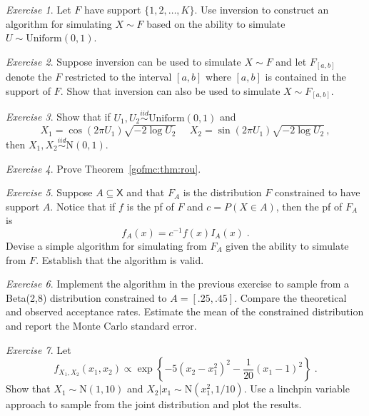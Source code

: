 \documentclass[12pt]{article}
\theoremstyle{plain}
\theoremstyle{definition}
\theoremstyle{remark}
\newtheorem{hw}{Exercise}[section]
\newcommand{\sX}{\mathsf{X}}
\begin{document}
\begin{hw}
Let $F$ have support $\{1,2,\ldots,K\}$.  Use inversion to construct
an algorithm for simulating $X \sim F$ based on the ability to
simulate $U \sim \text{Uniform}(0,1)$. 
\end{hw}

\begin{hw}
  Suppose inversion can be used to simulate $X \sim F$ and let
  $F_{[a,b]}$ denote the $F$ restricted to the interval $[a,b]$ where
  $[a,b]$ is contained in the support of $F$.  Show that inversion can
  also be used to simulate $X \sim F_{[a,b]}$.
\end{hw}

\begin{hw}
Show that if $U_1 , U_2 \stackrel{iid}{\sim}
  \text{Uniform}(0,1)$ and
\[
X_1 = \cos(2\pi U_1) \sqrt{-2 \log U_2} ~~~~~~ X_2 = \sin(2\pi U_1)
\sqrt{-2 \log U_2}\, ,
\]
then $X_1, X_2 \stackrel{iid}{\sim}\text{N}(0,1)$.
\end{hw}

\begin{hw}
Prove Theorem~\ref{gofmc:thm:rou}.
\end{hw}

\begin{hw}
Suppose $A \subseteq \sX$ and that $F_{A}$ is the distribution $F$
constrained to have support $A$.  Notice that if $f$ is the pf of $F$
and $c= P(X \in A)$, then the pf of $F_{A}$ is
\[
f_{A}(x) = c^{-1} f(x) I_{A}(x) \; .
\]
Devise a simple algorithm for simulating from $F_A$ given the ability
to simulate from $F$.  Establish that the algorithm is valid.  
\end{hw}

\begin{hw}
Implement the algorithm in the previous exercise to sample from a
Beta(2,8) distribution constrained to $A=[.25,.45]$.  Compare the
theoretical and observed acceptance rates. Estimate the mean of the
constrained distribution and report the Monte Carlo standard error. 
\end{hw}

\begin{hw}
Let
$$
f_{X_1, X_2}(x_1, x_2) \propto \exp \left\{ -5(x_2 - x_{1}^{2})^{2} -
  \frac{1}{20} (x_1 - 1)^{2} \right\} \; . 
$$
Show that $X_1 \sim \text{N}(1,10)$ and $X_{2}|x_1 \sim
\text{N}(x_{1}^2, 1/10)$. Use a linchpin variable approach to sample
from the joint distribution and plot the results.   
\end{hw}
\end{document}
